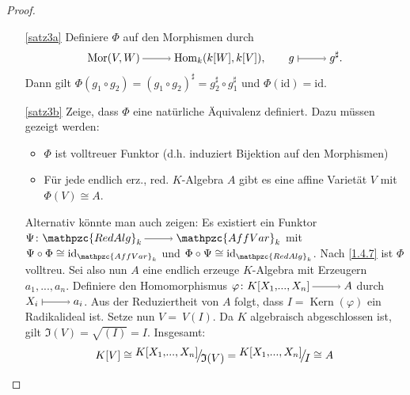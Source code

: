 \documentclass[a4paper,12pt]{scrbook}
\newtheorem{proof}{Beweis}
\def\I{\mathfrak{I}}
\newcommand{\AffVar}{\mathpzc{AffVar}}
\newcommand{\RedAlg}{\mathpzc{RedAlg}}
\newcommand{\Hom}{\mathrm{Hom}}
\newcommand{\Mor}{\mathrm{Mor}}
\newcommand{\Kern}{\operatorname{Kern}}
\newcommand{\id}{\mathrm{id}}
\renewcommand{\phi}{\varphi}
\renewcommand{\dotsc}{\ensuremath{\!...}}
\newcommand{\ra}{\raisebox{-1pt}{\tikz{\draw[thin,shorten >=3pt, ->] (0,0) node{\hspace*{-2pt}} -- node{} (1,0);}}\penalty1000\relax}
\renewcommand{\mapsto}{\raisebox{-1pt}{\tikz{\draw[thin,shorten >=3pt, |->] (0,0) node{\hspace*{0pt}} -- node{} (1,0);}}\penalty1000\relax}
\newcommand{\Quotient}[2]{
  \mathchoice
  { %
    \raisebox{0.7ex}{\ensuremath{#1}}
    \ensuremath{\mkern-3mu}\big/\ensuremath{\mkern-3mu}
    \raisebox{-0.6ex}{\ensuremath{#2}}
  }
  { %
    #1/#2
  }
  { %
    #1/#2
  }
  { %
    #1/#2
  }
}
\newcommand{\polyx}[1][n]{\ensuremath%
  [X_{1},\dotsc,X_{#1}]}
\begin{document}
\begin{proof}
\begin{enumerate}
\item[\ref{satz3a}] Definiere $\Phi$ auf den Morphismen durch 
\[\Mor(V,W)\ra \Hom_k(k[W],k[V]), \qquad g\mapsto g^{\sharp}.\]
Dann gilt $\Phi(g_1\circ g_2)=(g_1\circ g_2)^{\sharp}=g_2^\sharp\circ g_1^\sharp$ und $\Phi(\id)=\id$.
\item[\ref{satz3b}] Zeige, dass $\Phi$ eine natürliche Äquivalenz definiert. Dazu müssen gezeigt werden: 
\begin{itemize}
\item $\Phi$ ist volltreuer Funktor (d.h. induziert Bijektion auf den Morphismen)
\item Für jede endlich erz., red. $K$-Algebra $A$ gibt es eine affine Varietät $V$ mit $\Phi(V)\cong A$. 
\end{itemize}
Alternativ könnte man auch zeigen: Es existiert ein Funktor $\Psi\colon  \RedAlg_k\ra \AffVar_k$ mit $\Psi\circ \Phi\cong \id_{\AffVar_k}$ und $\Phi\circ \Psi\cong \id_{\RedAlg_k}$.
Nach \cref{1.4.7} ist $\Phi$ volltreu. Sei also nun $A$ eine endlich erzeuge $K$-Algebra mit Erzeugern $a_1,\dotsc,a_n$.
Definiere den Homomorphismus $\phi\colon  K\polyx\ra A$ durch $X_i\mapsto a_i$. Aus der Reduziertheit von $A$ folgt, dass
$I=\Kern(\phi)$ ein Radikalideal ist. Setze nun $V=\ V(I)$. Da $K$ algebraisch abgeschlossen ist, gilt $\I(V)=\sqrt{(I)}=I$. Insgesamt:
\[K[V]\cong\Quotient{K\polyx}{\I(V)}=\Quotient{K\polyx}{I}\cong A\] 
\end{enumerate}
\end{proof}
\end{document}
